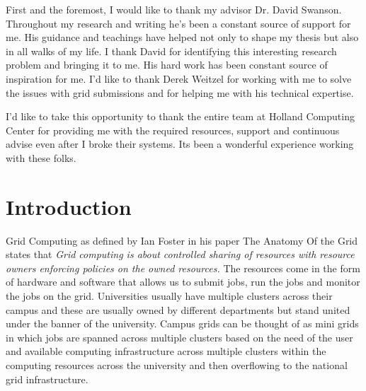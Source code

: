 \documentclass[ms,electronic,double]{nuthesis}
\begin{document}

\begin{acknowledgments}

First and the foremost, I would like to thank my advisor Dr. David Swanson. Throughout my research
and writing he's been a constant source of support for me. His guidance and teachings have helped not 
only to shape my thesis but also in all walks of my life. I thank David for identifying this interesting
research problem and bringing it to me. His hard work has been constant source of inspiration
for me. I'd like to thank Derek Weitzel for working with me to solve the 
 issues with grid submissions and for helping me with his technical expertise.
 
 I'd like to take this opportunity to thank the entire team at Holland 
Computing Center for providing me with the required resources, support and continuous advise
 even after I broke their systems. Its been a wonderful experience 
 working with these folks.
 
\end{acknowledgments}

\tableofcontents
\newpage
\listoffigures
\listoftables


\mainmatter

\chapter{Introduction}
Grid Computing as defined by Ian Foster in his paper The Anatomy Of the Grid \cite{Foster:2001:AGE:1080644.1080667}
states that 
\emph{Grid computing is about controlled sharing of resources with resource owners enforcing policies 
on the owned resources.} The resources come in the form of hardware 
and software that allows us to submit jobs, run the jobs and monitor the jobs on the grid. 
Universities usually have multiple clusters across their campus and these are 
usually owned by different departments but stand united under the banner of the university.
Campus grids can be thought of as mini grids in which jobs are spanned across multiple clusters
 based on the need of the user and available computing infrastructure 
across multiple clusters within the computing resources across the university and then overflowing to the national
grid infrastructure\cite{derekThesis}.
\end{document}

